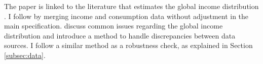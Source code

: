 The paper is linked to the literature that estimates the global income distribution \citep{pinkovskiy_parametric_2009,anand_chapter_2015,lahoti_global_2016,lakner_global_2016,gradin_trends_2021,jorda_global_2019,alvaredo_methods_2021,fisher-post_government_2023,milanovic_three_2024}. 
I follow \cite{lakner_global_2016} by merging income and consumption data without adjustment in the main specification. 
\cite{anand_chapter_2015} discuss common issues regarding the global income distribution and introduce a method to handle discrepancies between data sources. I follow a similar method as a robustness check, as explained in Section \ref{subsec:data}. 

